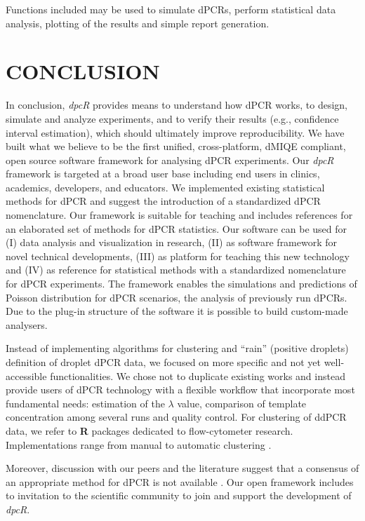\documentclass[a4,center,fleqn]{NAR}
\begin{document}
Functions included may be used to simulate dPCRs, perform statistical data 
analysis, plotting of the results and simple report generation. 

\section{CONCLUSION}

In conclusion, \textit{dpcR} provides means to understand how dPCR works, to 
design, simulate and analyze experiments, and to verify their results (e.g., 
confidence interval estimation), which should ultimately improve 
reproducibility. We have built what we believe to be the first unified, 
cross-platform, dMIQE compliant, open source software framework for analysing 
dPCR experiments. Our \textit{dpcR} framework is targeted at a broad user base 
including end users in clinics, academics, developers, and educators. We 
implemented existing statistical methods for dPCR and suggest the introduction 
of a standardized dPCR nomenclature. Our framework is suitable for teaching and 
includes references for an elaborated set of methods for dPCR statistics. Our 
software can be used for (I) data analysis and visualization in research, (II) 
as software framework for novel technical developments, (III) as platform for 
teaching this new technology and (IV) as reference for statistical methods with 
a standardized nomenclature for dPCR experiments. The framework enables the 
simulations and predictions of Poisson distribution for dPCR scenarios, the 
analysis of previously run dPCRs. Due to the plug-in structure of the software 
it is possible to build custom-made analysers.

Instead of implementing algorithms for clustering and ``rain'' (positive 
droplets) definition of droplet dPCR data, we focused on more specific and not 
yet well-accessible functionalities. We chose not to duplicate existing works 
and instead provide users of dPCR technology with a flexible workflow that 
incorporate most fundamental needs: estimation of the $\lambda$ value, 
comparison of template concentration among several runs and quality control. For 
clustering of ddPCR data, we refer to \textbf{R} packages dedicated to 
flow-cytometer research. Implementations range from manual to automatic 
clustering \cite{le_meur_computational_2013, milbury_determining_2014, 
Malek15022015, trypsteen_ddpcrquant_2015}. 

Moreover, discussion with our peers 
and the literature suggest that a consensus of an appropriate method for dPCR is 
not available \cite{trypsteen_ddpcrquant_2015}.
Our open framework includes to invitation to the scientific community to join 
and support the development of \textit{dpcR}.
\end{document}
